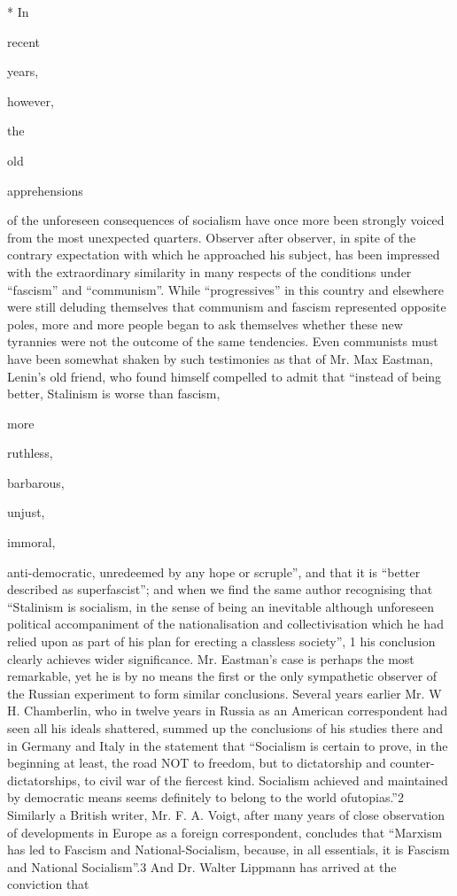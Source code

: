 \documentclass[11pt,openany]{book}
\begin{document}
\begin{center}\textasteriskcentered\hspace{0.9em}\textasteriskcentered\hspace{0.9em}\textasteriskcentered\end{center}

* In

recent

years,

however,

the

old

apprehensions

of the unforeseen consequences of socialism have once more been strongly voiced from the most unexpected quarters. Observer after observer, in spite of the contrary expectation with which he approached his subject, has been impressed with the extraordinary similarity in many respects of the conditions under ``fascism'' and ``communism''. While ``progressives'' in this country and elsewhere were still deluding themselves that communism and fascism represented opposite poles, more and more people began to ask themselves whether these new tyrannies were not the outcome of the same tendencies. Even communists must have been somewhat shaken by such testimonies as that of Mr. Max Eastman, Lenin's old friend, who found himself compelled to admit that ``instead of being better, Stalinism is worse than fascism,

more

ruthless,

barbarous,

unjust,

immoral,

anti-democratic, unredeemed by any hope or scruple'', and that it is ``better described as superfascist''; and when we find the same author recognising that ``Stalinism is socialism, in the sense of being an inevitable although unforeseen political accompaniment of the nationalisation and collectivisation which he had relied upon as part of his plan for erecting a classless society'', 1 his conclusion clearly achieves wider significance. Mr. Eastman's case is perhaps the most remarkable, yet he is by no means the first or the only sympathetic observer of the Russian experiment to form similar conclusions. Several years earlier Mr. W H. Chamberlin, who in twelve years in Russia as an American correspondent had seen all his ideals shattered, summed up the conclusions of his studies there and in Germany and Italy in the statement that ``Socialism is certain to prove, in the beginning at least, the road NOT to freedom, but to dictatorship and counter-dictatorships, to civil war of the fiercest kind. Socialism achieved and maintained by democratic means seems definitely to belong to the world ofutopias.''2 Similarly a British writer, Mr. F. A. Voigt, after many years of close observation of developments in Europe as a foreign correspondent, concludes that ``Marxism has led to Fascism and National-Socialism, because, in all essentials, it is Fascism and National Socialism''.3 And Dr. Walter Lippmann has arrived at the conviction that
\end{document}
